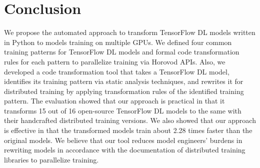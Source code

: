 \section{Conclusion}\label{sec:conclusion}
We propose the automated approach to transform TensorFlow DL models written in
Python to models training on multiple GPUs.
We defined four common training patterns for TensorFlow DL models and formal
code transformation rules for each pattern to parallelize training via Horovod
APIs.
Also, we developed a code transformation tool that takes a TensorFlow DL model,
identifies its training pattern via static analysis techniques, and rewrites
it for distributed training by applying transformation rules of the identified
training pattern.
The evaluation showed that our approach is practical in that it transforms 15
out of 16 open-source TensorFlow DL models to the same with their handcrafted
distributed training versions.
We also showed that our approach is effective in that the transformed models
train about 2.28 times faster than the original models.
We believe that our tool reduces model engineers' burdens in rewriting models
in accordance with the documentation of distributed training libraries to
parallelize training.







